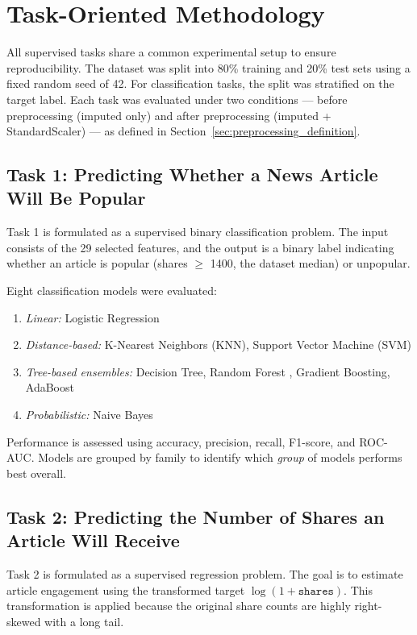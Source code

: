 \section{Task-Oriented Methodology}

All supervised tasks share a common experimental setup to ensure reproducibility. The dataset was split into 80\% training and 20\% test sets using a fixed random seed of 42. For classification tasks, the split was stratified on the target label. Each task was evaluated under two conditions --- before preprocessing (imputed only) and after preprocessing (imputed + StandardScaler) --- as defined in Section~\ref{sec:preprocessing_definition}.

\subsection{Task 1: Predicting Whether a News Article Will Be Popular}
Task 1 is formulated as a supervised binary classification problem. The input consists of the 29 selected features, and the output is a binary label indicating whether an article is popular (shares $\geq$ 1400, the dataset median) or unpopular.

Eight classification models were evaluated:
\begin{enumerate}[leftmargin=1.5em]
    \item \textit{Linear:} Logistic Regression \cite{hosmer2013logistic}
    \item \textit{Distance-based:} K-Nearest Neighbors (KNN), Support Vector Machine (SVM)
    \item \textit{Tree-based ensembles:} Decision Tree, Random Forest \cite{breiman2001rf,biau2016rf}, Gradient Boosting, AdaBoost
    \item \textit{Probabilistic:} Naive Bayes
\end{enumerate}

Performance is assessed using accuracy, precision, recall, F1-score, and ROC-AUC. Models are grouped by family to identify which \textit{group} of models performs best overall.

\subsection{Task 2: Predicting the Number of Shares an Article Will Receive}
Task 2 is formulated as a supervised regression problem. The goal is to estimate article engagement using the transformed target $\log(1 + \texttt{shares})$. This transformation is applied because the original share counts are highly right-skewed with a long tail.

